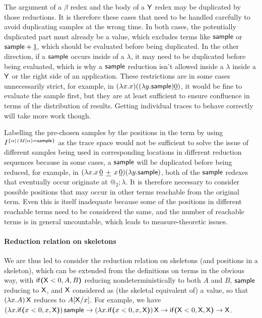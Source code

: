 The argument of a $\beta$ redex and the body of a $\mathsf{Y}$ redex may be duplicated by those reductions. It is therefore these cases that need to be handled carefully to avoid duplicating samples at the wrong time. In both cases, the potentially duplicated part must already be a value, which excludes terms like $\mathsf{sample}$ or $\mathsf{sample} + \underline 1$, which should be evaluated before being duplicated. In the other direction, if a $\mathsf{sample}$ occurs inside of a $\lambda$, it may need to be duplicated before being evaluated, which is why a $\mathsf{sample}$ reduction isn't allowed inside a $\lambda$ inside a $\mathsf{Y}$ or the right side of an application. These restrictions are in some cases unnecessarily strict, for example, in $(\lambda x. x) ((\lambda y. \mathsf{sample}) \underline 0)$, it would be fine to evaluate the sample first, but they are at least sufficient to ensure confluence in terms of the distribution of results. Getting individual traces to behave correctly will take more work though.

Labelling the pre-chosen samples by the positions in the term by using $I^{\{\alpha \mid \, (M \mid \alpha) = \mathsf{sample}\}}$ as the trace space would not be sufficient to solve the issue of different samples being used in corresponding locations in different reduction sequences because in some cases, a $\mathsf{sample}$ will be duplicated before being reduced, for example, in $(\lambda x. x \, {\underline 0} \, \mathbin{\underline{+}} \, {x \, \underline 0}) (\lambda y. \mathsf{sample})$, both of the $\mathsf{sample}$ redexes that eventually occur originate at $@_2 ; \lambda$. 
It is therefore necessary to consider possible positions that may occur in other terms reachable from the original term. 
Even this is itself inadequate because some of the positions in different reachable terms need to be considered the same, and the number of reachable terms is in general uncountable, which leads to measure-theoretic issues.

\paragraph*{Reduction relation on skeletons} We are thus led to consider the reduction relation on skeletons (and positions in a skeleton), which can be extended from the definitions on terms in the obvious way, with $\mathsf{if}\boldsymbol{(}\mathsf{X} < 0, A, B\boldsymbol{)}$ reducing nondeterministically to both $A$ and $B$, $\mathsf{sample}$ reducing to $\mathsf{X}$, and $\mathsf{X}$ considered as (the skeletal equivalent of) a value, so that $(\lambda x.A) \, \mathsf{X}$ reduces to $A[\mathsf{X} / x]$.
For example, we have 
\(
(\lambda x . \mathsf{if}\boldsymbol{(}x < 0, x, \mathsf{X}\boldsymbol{)}) \, \mathsf{sample}
\to
(\lambda x . \mathsf{if}\boldsymbol{(}x < 0, x, \mathsf{X}\boldsymbol{)}) \, \mathsf{X}
\to
\mathsf{if}\boldsymbol{(}\mathsf{X} < 0, \mathsf{X}, \mathsf{X}\boldsymbol{)}
\to
\mathsf{X}
\).

